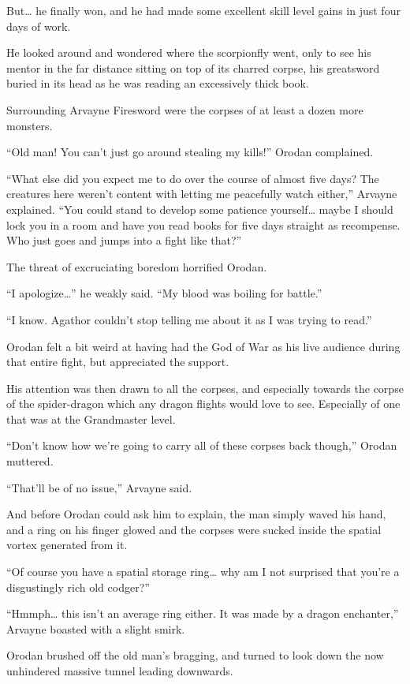 \documentclass[a4paper,10pt]{book}
\begin{document}
But… he finally won, and he had made some excellent skill level gains in just four days of work.\par
He looked around and wondered where the scorpionfly went, only to see his mentor in the far distance sitting on top of its charred corpse, his greatsword buried in its head as he was reading an excessively thick book.\par
Surrounding Arvayne Firesword were the corpses of at least a dozen more monsters.\par
“Old man! You can’t just go around stealing my kills!” Orodan complained.\par
“What else did you expect me to do over the course of almost five days? The creatures here weren’t content with letting me peacefully watch either,” Arvayne explained. “You could stand to develop some patience yourself… maybe I should lock you in a room and have you read books for five days straight as recompense. Who just goes and jumps into a fight like that?”\par
The threat of excruciating boredom horrified Orodan.\par
“I apologize…” he weakly said. “My blood was boiling for battle.”\par
“I know. Agathor couldn’t stop telling me about it as I was trying to read.”\par
Orodan felt a bit weird at having had the God of War as his live audience during that entire fight, but appreciated the support.\par
His attention was then drawn to all the corpses, and especially towards the corpse of the spider-dragon which any dragon flights would love to see. Especially of one that was at the Grandmaster level.\par
“Don’t know how we’re going to carry all of these corpses back though,” Orodan muttered.\par
“That’ll be of no issue,” Arvayne said.\par
And before Orodan could ask him to explain, the man simply waved his hand, and a ring on his finger glowed and the corpses were sucked inside the spatial vortex generated from it.\par
“Of course you have a spatial storage ring… why am I not surprised that you’re a disgustingly rich old codger?”\par
“Hmmph… this isn’t an average ring either. It was made by a dragon enchanter,” Arvayne boasted with a slight smirk.\par
Orodan brushed off the old man’s bragging, and turned to look down the now unhindered massive tunnel leading downwards.\par
\end{document}
